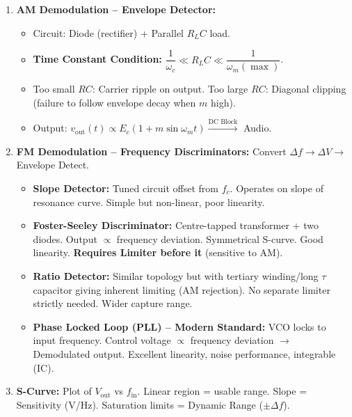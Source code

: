 \documentclass[11pt]{article}
\begin{document}
\begin{methode}
\begin{enumerate}
\item \textbf{AM Demodulation -- Envelope Detector:}
\begin{itemize}
\item Circuit: Diode (rectifier) + Parallel $R_L C$ load.
\item \textbf{Time Constant Condition:} $\dfrac{1}{\omega_c} \ll R_L C \ll \dfrac{1}{\omega_m(\max)}$.
\item Too small $RC$: Carrier ripple on output. Too large $RC$: Diagonal clipping (failure to follow envelope decay when $m$ high).
\item Output: $v_{\mathrm{out}}(t) \propto E_c(1 + m \sin \omega_m t) \xrightarrow{\text{DC Block}}$ Audio.
\end{itemize}
\item \textbf{FM Demodulation -- Frequency Discriminators:} Convert $\Delta f \to \Delta V \to$ Envelope Detect.
\begin{itemize}
\item \textbf{Slope Detector:} Tuned circuit offset from $f_c$. Operates on slope of resonance curve. Simple but non-linear, poor linearity.
\item \textbf{Foster-Seeley Discriminator:} Centre-tapped transformer + two diodes. Output $\propto$ frequency deviation. Symmetrical S-curve. Good linearity. \textbf{Requires Limiter before it} (sensitive to AM).
\item \textbf{Ratio Detector:} Similar topology but with tertiary winding/long $\tau$ capacitor giving inherent limiting (AM rejection). No separate limiter strictly needed. Wider capture range.
\item \textbf{Phase Locked Loop (PLL) -- Modern Standard:} VCO locks to input frequency. Control voltage $\propto$ frequency deviation $\to$ Demodulated output. Excellent linearity, noise performance, integrable (IC).
\end{itemize}
\item \textbf{S-Curve:} Plot of $V_{\mathrm{out}}$ vs $f_{\mathrm{in}}$. Linear region = usable range. Slope = Sensitivity (V/Hz). Saturation limits = Dynamic Range ($\pm \Delta f$).
\end{enumerate}
\end{methode}
\end{document}
